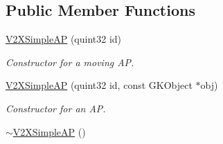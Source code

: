 \subsection*{Public Member Functions}
\begin{DoxyCompactItemize}
\item 
\hyperlink{classV2XSimpleAP_a116cd6eb21bc9e0d7139e0b48c33fe0f}{V2\+X\+Simple\+AP} (quint32 id)
\begin{DoxyCompactList}\small\item\em Constructor for a moving AP. \end{DoxyCompactList}\item 
\hyperlink{classV2XSimpleAP_abbccd4bcd32f15679490de5874ea8805}{V2\+X\+Simple\+AP} (quint32 id, const G\+K\+Object $\ast$obj)
\begin{DoxyCompactList}\small\item\em Constructor for an AP. \end{DoxyCompactList}\item 
\hyperlink{classV2XSimpleAP_a95e176fa9df41ed4a168493b55175d30}{$\sim$\+V2\+X\+Simple\+AP} ()\hypertarget{classV2XSimpleAP_a95e176fa9df41ed4a168493b55175d30}{}\label{classV2XSimpleAP_a95e176fa9df41ed4a168493b55175d30}


\end{DoxyCompactItemize}

